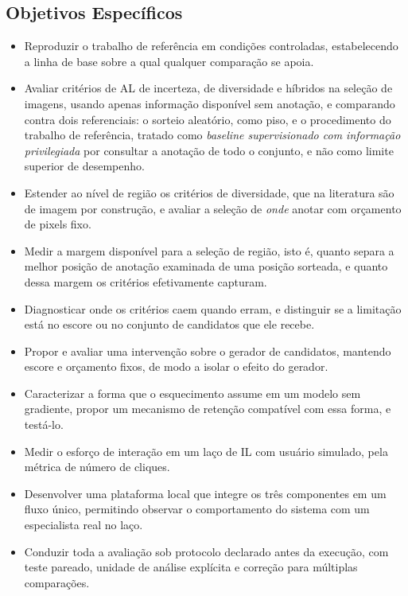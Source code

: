 \subsection{Objetivos Específicos}

\begin{itemize}

\item Reproduzir o trabalho de referência \cite{soares2026flim} em condições controladas, estabelecendo a linha de base sobre a qual qualquer comparação se apoia.

\item Avaliar critérios de \ac{AL} de incerteza, de diversidade e híbridos na seleção de imagens, usando apenas informação disponível sem anotação, e comparando contra dois referenciais: o sorteio aleatório, como piso, e o procedimento do trabalho de referência, tratado como \emph{baseline supervisionado com informação privilegiada} por consultar a anotação de todo o conjunto, e não como limite superior de desempenho.

\item Estender ao nível de região os critérios de diversidade, que na literatura são de imagem por construção, e avaliar a seleção de \emph{onde} anotar com orçamento de pixels fixo.

\item Medir a margem disponível para a seleção de região, isto é, quanto separa a melhor posição de anotação examinada de uma posição sorteada, e quanto dessa margem os critérios efetivamente capturam.

\item Diagnosticar onde os critérios caem quando erram, e distinguir se a limitação está no escore ou no conjunto de candidatos que ele recebe.

\item Propor e avaliar uma intervenção sobre o gerador de candidatos, mantendo escore e orçamento fixos, de modo a isolar o efeito do gerador.

\item Caracterizar a forma que o esquecimento assume em um modelo sem gradiente, propor um mecanismo de retenção compatível com essa forma, e testá-lo.

\item Medir o esforço de interação em um laço de \ac{IL} com usuário simulado, pela métrica de número de cliques.

\item Desenvolver uma plataforma local que integre os três componentes em um fluxo único, permitindo observar o comportamento do sistema com um especialista real no laço.

\item Conduzir toda a avaliação sob protocolo declarado antes da execução, com teste pareado, unidade de análise explícita e correção para múltiplas comparações.

\end{itemize}


